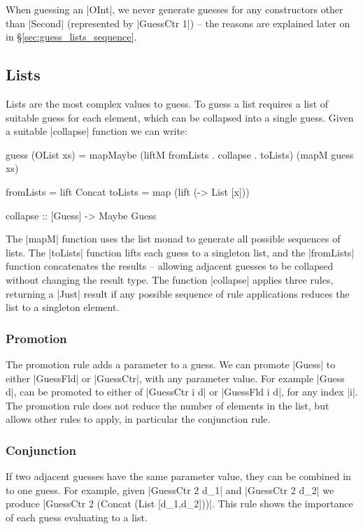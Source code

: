 \documentclass[preprint,draft]{sigplanconf}
\begin{document}
When guessing an |OInt|, we never generate guesses for any constructors other than |Second| (represented by |GuessCtr 1|) -- the reasons are explained later on in \S\ref{sec:guess_lists_sequence}.

\subsection{Lists}
\label{sec:guess_lists}

Lists are the most complex values to guess. To guess a list requires a list of suitable guess for each element, which can be collapsed into a single guess. Given a suitable |collapse| function we can write:

\begin{code}
guess (OList xs) = mapMaybe
    (liftM fromLists . collapse . toLists) (mapM guess xs)

fromLists  = lift Concat
toLists    = map (lift (\x -> List [x]))

collapse :: [Guess] -> Maybe Guess
\end{code}

The |mapM| function uses the list monad to generate all possible sequences of lists. The |toLists| function lifts each guess to a singleton list, and the |fromLists| function concatenates the results -- allowing adjacent guesses to be collapsed without changing the result type. The function |collapse| applies three rules, returning a |Just| result if any possible sequence of rule applications reduces the list to a singleton element.

\subsubsection{Promotion}

The promotion rule adds a parameter to a guess. We can promote |Guess| to either |GuessFld| or |GuessCtr|, with any parameter value. For example |Guess d|, can be promoted to either of |GuessCtr i d| or |GuessFld i d|, for any index |i|. The promotion rule does not reduce the number of elements in the list, but allows other rules to apply, in particular the conjunction rule.

\subsubsection{Conjunction}

If two adjacent guesses have the same parameter value, they can be combined in to one guess. For example, given |GuessCtr 2 d_1| and |GuessCtr 2 d_2| we produce |GuessCtr 2 (Concat (List [d_1,d_2]))|. This rule shows the importance of each guess evaluating to a list.
\end{document}
